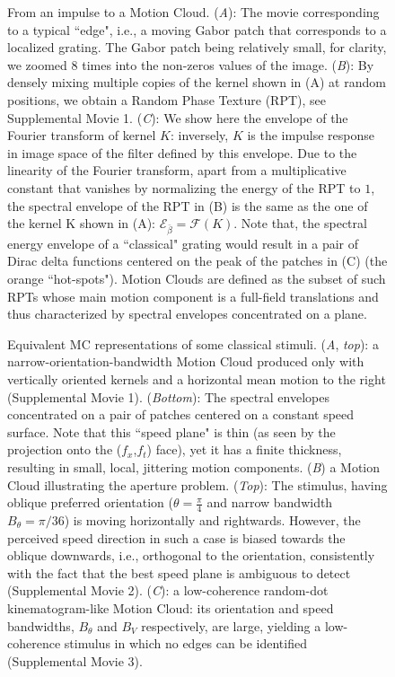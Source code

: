 \documentclass[a4paper,11pt]{article}%
\begin{document}
\begin{figure}%
	 \caption{From an impulse to a Motion Cloud. (\textit{A}): The movie corresponding to a typical ``edge", i.e., a moving Gabor patch that corresponds to a localized grating. The Gabor patch being relatively small, for clarity, we zoomed 8 times into the non-zeros values of the image. (\textit{B}): By densely mixing multiple copies of the kernel shown in (A) at random positions, we obtain a Random Phase Texture (RPT), see Supplemental Movie 1. (\textit{C}):  We show here the envelope of the Fourier transform of kernel $K$: inversely, $K$ is the impulse response in image space of the filter defined by this envelope. Due to the linearity of the Fourier transform, apart from a multiplicative constant that vanishes by normalizing the energy of the  RPT to $1$, the spectral envelope of the RPT in (B) is the same as the one of the kernel K shown in (A): $\mathcal{E}_{\bar{\beta}}=\mathcal{F}(K)$. Note that, the spectral energy envelope  of a ``classical" grating would result in a pair of Dirac delta functions centered on the peak of the patches in (C) (the orange ``hot-spots"). Motion Clouds are defined as the subset of such RPTs whose main motion component is a full-field translations and thus characterized by spectral envelopes concentrated on a plane.}%
	 \label{fig:impulse}
\end{figure}
\newpage %
\begin{figure}%
	 \caption{Equivalent MC representations of some classical stimuli. (\textit{A}, \textit{top}): a narrow-orientation-bandwidth Motion Cloud produced only with vertically oriented kernels and a horizontal mean motion to the right (Supplemental Movie 1). (\textit{Bottom}): The spectral envelopes concentrated on a pair of patches centered on a constant speed surface. Note that this ``speed plane" is thin (as seen by the projection onto the ($f_x$,$f_t$) face), yet it has a finite thickness, resulting in small, local, jittering motion components. ({\textit{B}}) a Motion Cloud illustrating the aperture problem. (\textit{Top}): The stimulus, having oblique preferred orientation ($\theta=\frac{\pi}{4}$ and narrow bandwidth $B_{\theta}=\pi/36$) is moving horizontally and rightwards. However, the perceived speed direction in such a case is biased towards the oblique downwards, i.e., orthogonal to the orientation, consistently with the fact that the best speed plane is ambiguous to detect (Supplemental Movie 2). (\textit{C}): a low-coherence random-dot kinematogram-like Motion Cloud: its orientation and speed bandwidths, $B_{\theta}$ and $B_{V}$ respectively, are large, yielding a low-coherence stimulus in which no edges can be identified (Supplemental Movie 3).} %
	 \label{fig:examples} %
\end{figure} %
\end{document}
